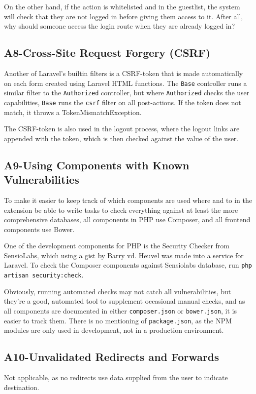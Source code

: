 On the other hand, if the action is whitelisted and in the guestlist, the system will check that they are not logged in before giving them access to it. After all, why should someone access the login route when they are already logged in?

\subsection{A8-Cross-Site Request Forgery (CSRF)}
\noindent
Another of Laravel's builtin filters is a CSRF-token that is made automatically on each form created using Laravel HTML functions. The \texttt{Base} controller runs a similar filter to the \texttt{Authorized} controller, but where \texttt{Authorized} checks the user capabilities, \texttt{Base} runs the \texttt{csrf} filter on all post-actions. If the token does not match, it throws a TokenMismatchException.

The CSRF-token is also used in the logout process, where the logout links are appended with the token, which is then checked against the value of the user.

\subsection{A9-Using Components with Known Vulnerabilities}
\noindent
To make it easier to keep track of which components are used where and to in the extension be able to write tasks to check everything against at least the more comprehensive databases, all components in PHP use
Composer, and all frontend components use Bower.

One of the development components for PHP is the Security
Checker\citep{SecurityCheck2013} from SensioLabs, which using a gist by Barry vd. Heuvel\citep{Gist2013bvh} was made into a service for Laravel. To check the Composer
components against Sensiolabs database, run \texttt{php artisan security:check}.

Obviously, running automated checks may not catch all vulnerabilities, but they're a good, automated tool to supplement occasional manual checks, and as all components are documented in either \texttt{composer.json} or \texttt{bower.json}, it is easier to track them. There is no mentioning of \texttt{package.json}, as the NPM modules are only used in development, not in a production environment.

\subsection{A10-Unvalidated Redirects and Forwards}
\noindent
Not applicable, as no redirects use data supplied from the user to indicate destination.


